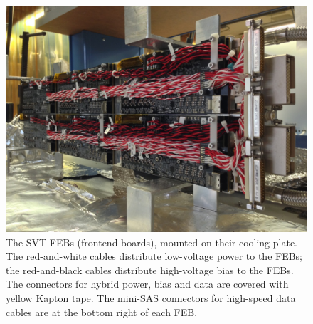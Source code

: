 \begin{figure}[ht]
    \includegraphics[width=\textwidth]{detector/figs/febplate}
    \caption{The SVT FEBs (frontend boards), mounted on their cooling plate. The red-and-white cables distribute low-voltage power to the FEBs; the red-and-black cables distribute high-voltage bias to the FEBs. The connectors for hybrid power, bias and data are covered with yellow Kapton tape. The mini-SAS connectors for high-speed data cables are at the bottom right of each FEB.}
    \label{fig:febplate}
\end{figure}

